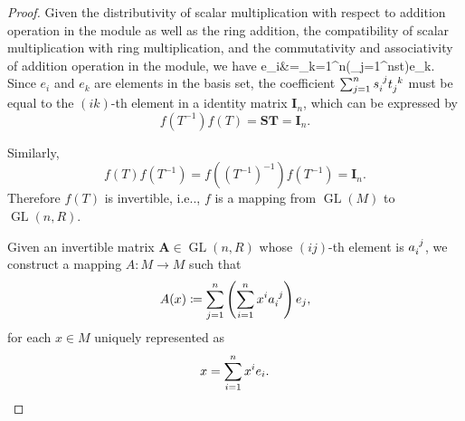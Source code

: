 \documentclass[12pt, letterpaper]{article}
\makeatletter
\newcommand{\GL}{\operatorname{GL}}
\newcommand{\id}{\indices}
\newcommand{\idm}{\mathbf{I}}
\newcommand{\bfA}{\mathbf{A}}
\newcommand{\bfT}{\mathbf{T}}
\newcommand{\bfS}{\mathbf{S}}
\newcommand\ie{i.e\@ifnextchar.{}{.\@}}
\newcommand{\define}{\coloneqq}
\newenvironment{eqlong}{\equation\aligned}{\endaligned\endequation}
\theoremstyle{definition}
\theoremstyle{remark}
\theoremstyle{definition}
\theoremstyle{plain}
\numberwithin{equation}{section}
\makeatother
\begin{document}
\begin{proof}
		Given the distributivity of scalar multiplication with respect to addition operation in the module as well as the ring addition,
		the compatibility of scalar multiplication with ring multiplication,
		and the commutativity and associativity of addition operation in the module,
		we have
		\begin{eqlong}
			e_i&=\sum_{k=1}^{n}\left(\sum_{j=1}^{n}s\id{_i^j}t\id{_j^k}\right)e_k.\\
		\end{eqlong}
		Since $e_i$ and $e_k$ are elements in the basis set, the coefficient $\sum_{j=1}^{n}s\id{_i^j}t\id{_j^k}$
		must be equal to the $(ik)$-th element in a identity matrix $\idm_n$, which can be expressed by
		\begin{equation}
			f(T^{-1})f(T)=\bfS\bfT=\idm_n.
		\end{equation}
		
		Similarly,
		\[f(T)f(T^{-1})=f((T^{-1})^{-1})f(T^{-1})=\idm_n.\]
		Therefore $f(T)$ is invertible, \ie, $f$ is a mapping from $\GL(M)$ to $\GL(n,R)$.
		
		Given an invertible matrix $\bfA\in \GL(n,R)$ whose $(ij)$-th element is $a\id{_i^j}$,
		we construct a mapping $A\colon M\to M$ such that
		\begin{equation}\label{eqAx}
			A(x)\define\sum_{j=1}^{n}\left(\sum_{i=1}^{n}x\id{^i}a\id{_i^j}\right)e_j,
		\end{equation}
		for each $x \in M$ uniquely represented as
		\begin{equation}\label{eqxdecomp}
			x = \sum_{i=1}^{n}x\id{^i}e_i.
		\end{equation}
		

\end{proof}
\end{document}
